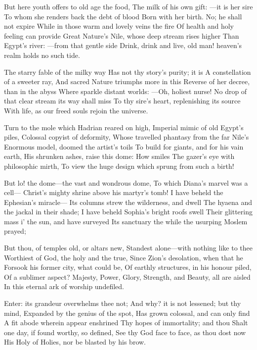 \documentclass[10pt,twocolumn]{book}
\begin{document}
   But here youth offers to old age the food,
   The milk of his own gift: ---it is her sire
   To whom she renders back the debt of blood
   Born with her birth.  No; he shall not expire
   While in those warm and lovely veins the fire
   Of health and holy feeling can provide
   Great Nature's Nile, whose deep stream rises higher
   Than Egypt's river: ---from that gentle side
Drink, drink and live, old man! heaven's realm holds no such tide.


   The starry fable of the milky way
   Has not thy story's purity; it is
   A constellation of a sweeter ray,
   And sacred Nature triumphs more in this
   Reverse of her decree, than in the abyss
   Where sparkle distant worlds: ---Oh, holiest nurse!
   No drop of that clear stream its way shall miss
   To thy sire's heart, replenishing its source
With life, as our freed souls rejoin the universe.


   Turn to the mole which Hadrian reared on high,
   Imperial mimic of old Egypt's piles,
   Colossal copyist of deformity,
   Whose travelled phantasy from the far Nile's
   Enormous model, doomed the artist's toils
   To build for giants, and for his vain earth,
   His shrunken ashes, raise this dome:  How smiles
   The gazer's eye with philosophic mirth,
To view the huge design which sprung from such a birth!


   But lo! the dome---the vast and wondrous dome,
   To which Diana's marvel was a cell---
   Christ's mighty shrine above his martyr's tomb!
   I have beheld the Ephesian's miracle---
   Its columns strew the wilderness, and dwell
   The hyaena and the jackal in their shade;
   I have beheld Sophia's bright roofs swell
   Their glittering mass i' the sun, and have surveyed
Its sanctuary the while the usurping Moslem prayed;


   But thou, of temples old, or altars new,
   Standest alone---with nothing like to thee\textemdash
   Worthiest of God, the holy and the true,
   Since Zion's desolation, when that he
   Forsook his former city, what could be,
   Of earthly structures, in his honour piled,
   Of a sublimer aspect?  Majesty,
   Power, Glory, Strength, and Beauty, all are aisled
In this eternal ark of worship undefiled.


   Enter:  its grandeur overwhelms thee not;
   And why? it is not lessened; but thy mind,
   Expanded by the genius of the spot,
   Has grown colossal, and can only find
   A fit abode wherein appear enshrined
   Thy hopes of immortality; and thou
   Shalt one day, if found worthy, so defined,
   See thy God face to face, as thou dost now
His Holy of Holies, nor be blasted by his brow.
\end{document}
